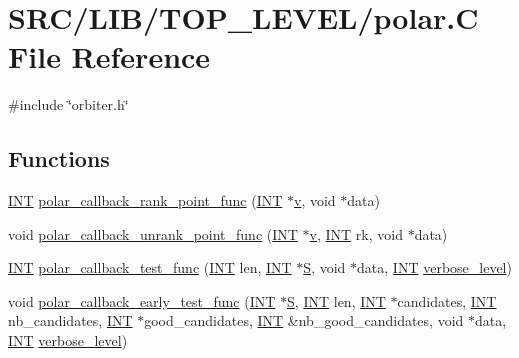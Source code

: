 \hypertarget{_l_i_b_2_t_o_p___l_e_v_e_l_2polar_8_c}{}\section{S\+R\+C/\+L\+I\+B/\+T\+O\+P\+\_\+\+L\+E\+V\+E\+L/polar.C File Reference}
\label{_l_i_b_2_t_o_p___l_e_v_e_l_2polar_8_c}
{\ttfamily \#include \char`\"{}orbiter.\+h\char`\"{}}\newline
\subsection*{Functions}
\begin{DoxyCompactItemize}
\item 
\mbox{\hyperlink{galois_8h_a09fddde158a3a20bd2dcadb609de11dc}{I\+NT}} \mbox{\hyperlink{_l_i_b_2_t_o_p___l_e_v_e_l_2polar_8_c_ac27fc96b6ab5856f2434fe9aa2e9d286}{polar\+\_\+callback\+\_\+rank\+\_\+point\+\_\+func}} (\mbox{\hyperlink{galois_8h_a09fddde158a3a20bd2dcadb609de11dc}{I\+NT}} $\ast$\mbox{\hyperlink{simeon_8_c_aeb3f3030944801b163bc3b829a7f6710}{v}}, void $\ast$data)
\item 
void \mbox{\hyperlink{_l_i_b_2_t_o_p___l_e_v_e_l_2polar_8_c_a7807178b6f85933bdbe8e6742c37886c}{polar\+\_\+callback\+\_\+unrank\+\_\+point\+\_\+func}} (\mbox{\hyperlink{galois_8h_a09fddde158a3a20bd2dcadb609de11dc}{I\+NT}} $\ast$\mbox{\hyperlink{simeon_8_c_aeb3f3030944801b163bc3b829a7f6710}{v}}, \mbox{\hyperlink{galois_8h_a09fddde158a3a20bd2dcadb609de11dc}{I\+NT}} rk, void $\ast$data)
\item 
\mbox{\hyperlink{galois_8h_a09fddde158a3a20bd2dcadb609de11dc}{I\+NT}} \mbox{\hyperlink{_l_i_b_2_t_o_p___l_e_v_e_l_2polar_8_c_a48f0dde0f5aa65c1a0a4dd7d8539a125}{polar\+\_\+callback\+\_\+test\+\_\+func}} (\mbox{\hyperlink{galois_8h_a09fddde158a3a20bd2dcadb609de11dc}{I\+NT}} len, \mbox{\hyperlink{galois_8h_a09fddde158a3a20bd2dcadb609de11dc}{I\+NT}} $\ast$\mbox{\hyperlink{simeon_8_c_adab47f8243f1b5a2c31df2535d6b37d0}{S}}, void $\ast$data, \mbox{\hyperlink{galois_8h_a09fddde158a3a20bd2dcadb609de11dc}{I\+NT}} \mbox{\hyperlink{simeon_8_c_a818073fbcc2f439e7c56952f67386122}{verbose\+\_\+level}})
\item 
void \mbox{\hyperlink{_l_i_b_2_t_o_p___l_e_v_e_l_2polar_8_c_a5b38572be2c1a14e0aa6f3a246351a61}{polar\+\_\+callback\+\_\+early\+\_\+test\+\_\+func}} (\mbox{\hyperlink{galois_8h_a09fddde158a3a20bd2dcadb609de11dc}{I\+NT}} $\ast$\mbox{\hyperlink{simeon_8_c_adab47f8243f1b5a2c31df2535d6b37d0}{S}}, \mbox{\hyperlink{galois_8h_a09fddde158a3a20bd2dcadb609de11dc}{I\+NT}} len, \mbox{\hyperlink{galois_8h_a09fddde158a3a20bd2dcadb609de11dc}{I\+NT}} $\ast$candidates, \mbox{\hyperlink{galois_8h_a09fddde158a3a20bd2dcadb609de11dc}{I\+NT}} nb\+\_\+candidates, \mbox{\hyperlink{galois_8h_a09fddde158a3a20bd2dcadb609de11dc}{I\+NT}} $\ast$good\+\_\+candidates, \mbox{\hyperlink{galois_8h_a09fddde158a3a20bd2dcadb609de11dc}{I\+NT}} \&nb\+\_\+good\+\_\+candidates, void $\ast$data, \mbox{\hyperlink{galois_8h_a09fddde158a3a20bd2dcadb609de11dc}{I\+NT}} \mbox{\hyperlink{simeon_8_c_a818073fbcc2f439e7c56952f67386122}{verbose\+\_\+level}})
\end{DoxyCompactItemize}


